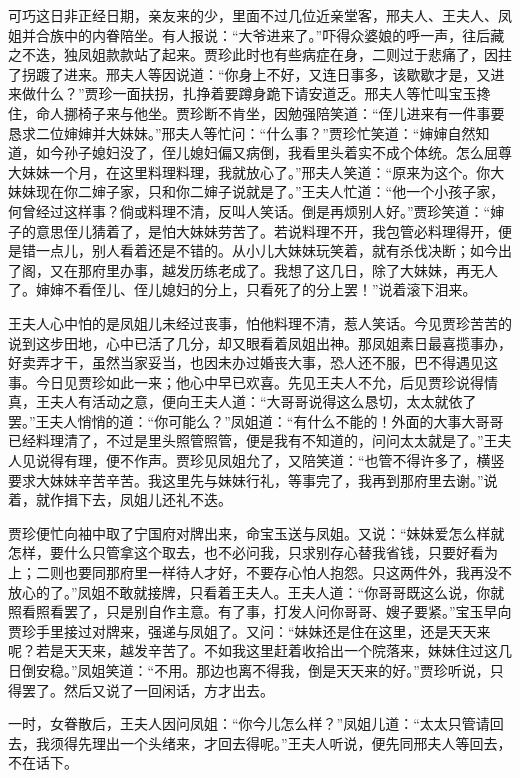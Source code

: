 \documentclass[12pt,oneside]{book}
\begin{document}
可巧这日非正经日期，亲友来的少，里面不过几位近亲堂客，邢夫人、王夫人、凤姐并合族中的内眷陪坐。有人报说：“大爷进来了。”吓得众婆娘的呼一声，往后藏之不迭，独凤姐款款站了起来。贾珍此时也有些病症在身，二则过于悲痛了，因拄了拐踱了进来。邢夫人等因说道：“你身上不好，又连日事多，该歇歇才是，又进来做什么？”贾珍一面扶拐，扎挣着要蹲身跪下请安道乏。邢夫人等忙叫宝玉搀住，命人挪椅子来与他坐。贾珍断不肯坐，因勉强陪笑道：“侄儿进来有一件事要恳求二位婶婶并大妹妹。”邢夫人等忙问：“什么事？”贾珍忙笑道：“婶婶自然知道，如今孙子媳妇没了，侄儿媳妇偏又病倒，我看里头着实不成个体统。怎么屈尊大妹妹一个月，在这里料理料理，我就放心了。”邢夫人笑道：“原来为这个。你大妹妹现在你二婶子家，只和你二婶子说就是了。”王夫人忙道：“他一个小孩子家，何曾经过这样事？倘或料理不清，反叫人笑话。倒是再烦别人好。”贾珍笑道：“婶子的意思侄儿猜着了，是怕大妹妹劳苦了。若说料理不开，我包管必料理得开，便是错一点儿，别人看着还是不错的。从小儿大妹妹玩笑着，就有杀伐决断；如今出了阁，又在那府里办事，越发历练老成了。我想了这几日，除了大妹妹，再无人了。婶婶不看侄儿、侄儿媳妇的分上，只看死了的分上罢！”说着滚下泪来。

王夫人心中怕的是凤姐儿未经过丧事，怕他料理不清，惹人笑话。今见贾珍苦苦的说到这步田地，心中已活了几分，却又眼看着凤姐出神。那凤姐素日最喜揽事办，好卖弄才干，虽然当家妥当，也因未办过婚丧大事，恐人还不服，巴不得遇见这事。今日见贾珍如此一来；他心中早已欢喜。先见王夫人不允，后见贾珍说得情真，王夫人有活动之意，便向王夫人道：“大哥哥说得这么恳切，太太就依了罢。”王夫人悄悄的道：“你可能么？”凤姐道：“有什么不能的！外面的大事大哥哥已经料理清了，不过是里头照管照管，便是我有不知道的，问问太太就是了。”王夫人见说得有理，便不作声。贾珍见凤姐允了，又陪笑道：“也管不得许多了，横竖要求大妹妹辛苦辛苦。我这里先与妹妹行礼，等事完了，我再到那府里去谢。”说着，就作揖下去，凤姐儿还礼不迭。

贾珍便忙向袖中取了宁国府对牌出来，命宝玉送与凤姐。又说：“妹妹爱怎么样就怎样，要什么只管拿这个取去，也不必问我，只求别存心替我省钱，只要好看为上；二则也要同那府里一样待人才好，不要存心怕人抱怨。只这两件外，我再没不放心的了。”凤姐不敢就接牌，只看着王夫人。王夫人道：“你哥哥既这么说，你就照看照看罢了，只是别自作主意。有了事，打发人问你哥哥、嫂子要紧。”宝玉早向贾珍手里接过对牌来，强递与凤姐了。又问：“妹妹还是住在这里，还是天天来呢？若是天天来，越发辛苦了。不如我这里赶着收拾出一个院落来，妹妹住过这几日倒安稳。”凤姐笑道：“不用。那边也离不得我，倒是天天来的好。”贾珍听说，只得罢了。然后又说了一回闲话，方才出去。

一时，女眷散后，王夫人因问凤姐：“你今儿怎么样？”凤姐儿道：“太太只管请回去，我须得先理出一个头绪来，才回去得呢。”王夫人听说，便先同邢夫人等回去，不在话下。
\end{document}
